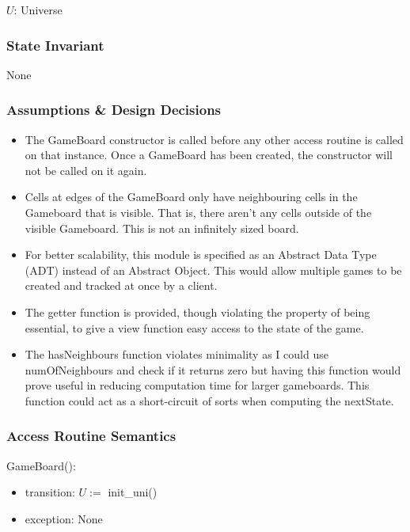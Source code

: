\documentclass[12pt]{article}
\begin{document}
$U$: Universe

\subsubsection* {State Invariant}

None

\subsubsection* {Assumptions \& Design Decisions}

\begin{itemize}

\item The GameBoard constructor is called before any other access
  routine is called on that instance. Once a GameBoard has been created, the
  constructor will not be called on it again.

\item Cells at edges of the GameBoard only have neighbouring cells in the
Gameboard that is visible. That is, there aren't any cells outside of the
visible Gameboard. This is not an infinitely sized board.

\item For better scalability, this module is specified as an Abstract Data Type
  (ADT) instead of an Abstract Object. This would allow multiple games to be
  created and tracked at once by a client.

\item The getter function is provided, though violating the property of being
  essential, to give a view function easy access to the state of the
  game.
  
\item The hasNeighbours function violates minimality as I could use 
numOfNeighbours and check if it returns zero but having this function would 
prove useful in reducing computation time for larger gameboards. This
function could act as a short-circuit of sorts when computing the nextState.

\end{itemize}

\subsubsection* {Access Routine Semantics}

GameBoard():
\begin{itemize}
\item transition: $U :=$ init\_uni()
\item exception: None
\end{itemize}
\end{document}
